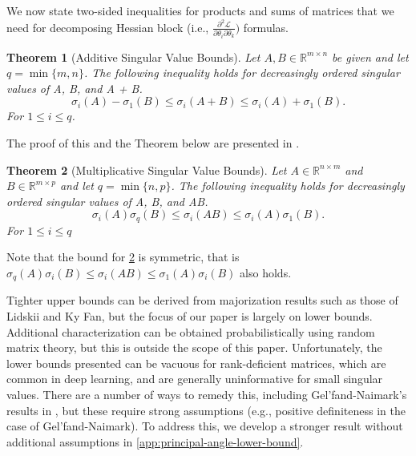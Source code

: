 \documentclass{article}
\theoremstyle{plain}
\newtheorem{theorem}{Theorem}
\theoremstyle{definition}
\theoremstyle{remark}
\begin{document}
We now state two-sided inequalities for products and sums of matrices that we need for decomposing Hessian block (i.e., $\frac{\partial^2 \mathcal{L}}{\partial \theta_i \partial \theta_k})$ formulas. 

\begin{theorem}[Additive Singular Value Bounds]
\label{thm:additive-singular-value-bounds}
Let $A, B \in \mathbb{R}^{m \times n}$ be given and let $q = \min\{m, n\}$. The following inequality holds for decreasingly ordered singular values of A, B, and A + B. 
\begin{equation*}
\sigma_i(A) - \sigma_1(B) \leq \sigma_i(A + B) \leq \sigma_i(A) + \sigma_1(B).
\end{equation*}
For $1 \leq i \leq q$.
\end{theorem}

The proof of this and the Theorem below are presented in \citet[Th 3.3.16]{Horn_Johnson_1991}.

\begin{theorem}[Multiplicative Singular Value Bounds]
\label{thm:multiplicative-singular-value-bounds}
Let $A \in \mathbb{R}^{n \times m}$ and $B \in \mathbb{R}^{m \times p}$ and let $q = \min\{n, p\}$. The following inequality holds for decreasingly ordered singular values of A, B, and AB. 
\begin{equation*}
\sigma_i(A) \sigma_{q}(B) \leq \sigma_i(AB) \leq \sigma_i(A) \sigma_1(B).
\end{equation*}
For $1 \leq i \leq q$
\end{theorem}

Note that the bound for \cref{thm:multiplicative-singular-value-bounds} is symmetric, that is \(
    \sigma_{q}(A) \sigma_i(B) \leq \sigma_i(AB) \leq \sigma_1(A) \sigma_i(B)
\) also holds.

Tighter upper bounds can be derived from majorization results such as those of Lidskii and Ky Fan, but the focus of our paper is largely on lower bounds. Additional characterization can be obtained probabilistically using random matrix theory, but this is outside the scope of this paper. Unfortunately, the lower bounds presented can be vacuous for rank-deficient matrices, which are common in deep learning, and are generally uninformative for small singular values. There are a number of ways to remedy this, including Gel'fand-Naimark's results in \citet[III.20]{bhatia2013matrix}, but these require strong assumptions (e.g., positive definiteness in the case of Gel'fand-Naimark). To address this, we develop a stronger result without additional assumptions in \cref{app:principal-angle-lower-bound}.
\end{document}
